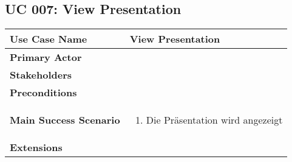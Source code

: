 \subsection{UC 007: View Presentation}
\label{uc:007-view-pres}

\begin{tabular}{|l|p{}|}
\hline
\textbf{Use Case Name} 	&	View Presentation	\\ \hline
\textbf{Primary Actor} 	&		\\ \hline
\textbf{Stakeholders}	&		\\ \hline
\textbf{Preconditions}	&		\\ \hline
\textbf{Main Success Scenario}	&
\begin{enumerate}
	\item Die Präsentation wird angezeigt
\end{enumerate}
\\ \hline
\textbf{Extensions}	& 	\\ \hline
\end{tabular}
